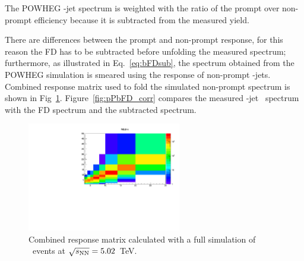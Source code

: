 The POWHEG \Dstar-jet spectrum is weighted with the ratio of the prompt over non-prompt efficiency because it is subtracted from the measured yield.

There are differences between the prompt and non-prompt response, for this reason the FD has to be subtracted before unfolding the measured spectrum; furthermore, as illustrated in Eq.~\ref{eq:bFDsub}, the spectrum obtained
from the POWHEG simulation is smeared using the response of non-prompt \Dstar-jets. Combined response matrix used to fold the simulated non-prompt spectrum is shown in Fig~\ref{fig:pPb_ResponseMatrix_nonprompt}.
Figure~\ref{fig:pPbFD_corr} compares the measured \Dstar-jet \pt\ spectrum with the FD spectrum and the subtracted spectrum.

\begin{figure}[bth]
\centering
\includegraphics[width=0.6\textwidth]{pPbplots/ResponseMatrix/combMatrixFD_DjetExcl5}
\caption{Combined response matrix calculated with a full simulation of \pPb\ events at $\sqrt{s_{\rm NN}}=5.02$~TeV.}
\label{fig:pPb_ResponseMatrix_nonprompt}
\end{figure}


